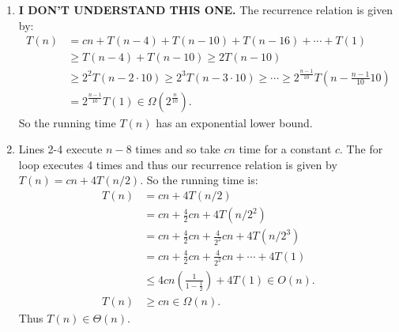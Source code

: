 \documentclass[10pt,oneside,reqno]{amsart}
\theoremstyle{plain}
\theoremstyle{definition}
\begin{document}
\begin{enumerate}[label=\arabic*.]
\item \textbf{I DON'T UNDERSTAND THIS ONE.}  The recurrence relation is given by: 
\begin{equation}
\begin{aligned}
T(n) &= cn + T(n - 4) + T(n - 10) + T(n - 16) + \cdots + T(1)\\
&\geqslant T(n - 4) + T(n - 10) \geq 2T(n - 10)\\
&\geqslant 2^2T(n - 2\cdot 10) \geqslant 2^3 T(n - 3\cdot 10) \geqslant \cdots \geqslant 2^{\frac{n - 1}{10}} T(n - \frac{n - 1}{10}10) \\
&= 2^{\frac{n - 1}{10}}T(1) \in \Omega(2^{\frac{n}{10}}). 
\end{aligned}
\end{equation}
So the running time $T(n)$ has an exponential lower bound. \\

\item Lines 2-4 execute $n - 8$ times and so take $cn$ time for a constant $c$. The for loop executes 4 times and thus our recurrence relation is given by $T(n) = cn + 4T( n/2 )$. So the running time is:
\begin{equation}
\begin{aligned}
T(n) &= cn + 4T( n/2 ) \\
&= cn + \frac{4}{2}cn + 4T(n/2^2)\\
&= cn + \frac{4}{2}cn+ \frac{4}{2^2}cn + 4T(n/2^3)\\
&= cn + \frac{4}{2}cn+ \frac{4}{2^2}cn + \cdots + 4T(1)\\
&\leqslant 4cn\left(\frac{1}{1 - \frac{1}{2}} \right) + 4T(1) \in O(n). \\
T(n) &\geqslant cn \in \Omega(n). 
\end{aligned}
\end{equation}
Thus $T(n) \in \Theta(n)$. \\



\end{enumerate}
\end{document}
